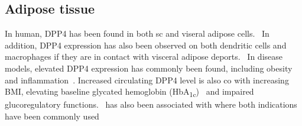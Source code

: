 \subsection{Adipose tissue}
In human, DPP4 has been found in both sc and viseral adipose cells.~\cite{Lamers2011} In addition, DPP4 expression has also been observed on both dendritic cells and macrophages if they are in contact with visceral adipose deports.~\cite{Zhong2013} In disease models, elevated DPP4 expression has commonly been found, including obesity and inflammation~\cite{Zhong2013}. Increased circulating DPP4 level is also co with increasing BMI, elevating baseline glycated hemoglobin (HbA\textsubscript{1c})~\cite{2011}  and impaired glucoregulatory functions.~\cite{Sell2013}  has also been associated with where both indications have been commonly used 